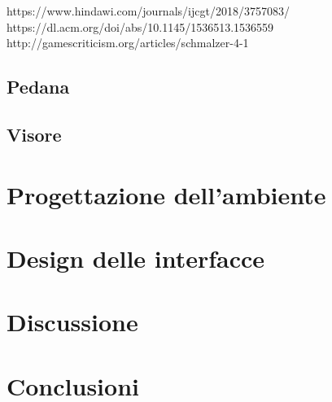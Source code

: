 \documentclass[target=bach,aauheader=]{thud}
\begin{document}
https://www.hindawi.com/journals/ijcgt/2018/3757083/ \\ %
https://dl.acm.org/doi/abs/10.1145/1536513.1536559 \\ %
http://gamescriticism.org/articles/schmalzer-4-1 \\ %



\section{Pedana}

\section{Visore}

\chapter{Progettazione dell'ambiente} %


\chapter{Design delle interfacce} %

\chapter{Discussione}

\chapter{Conclusioni} %


\backmatter
\end{document}
